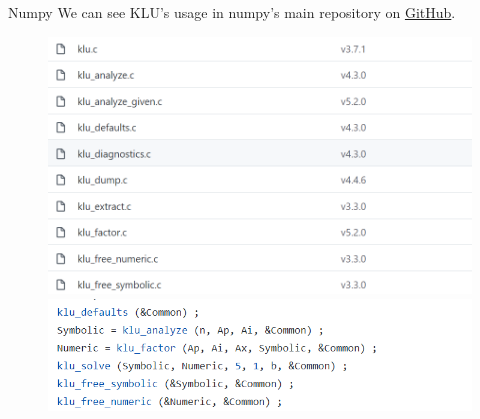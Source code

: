 \documentclass[9pt]{beamer}
\begin{document}
	\begin{frame}{Numpy}
		We can see KLU's usage in numpy's main repository on \href{https://github.com/numpy/numpy}{GitHub}.
		\begin{figure}[H]
			\centering
			\begin{minipage}[ht]{0.4\linewidth} %
				\centering
				\includegraphics[width=1\textwidth]{figures/numpy1.jpg}
			\end{minipage}
			\begin{minipage}[ht]{0.4\linewidth} %
				\centering
				\includegraphics[width=1.2\textwidth]{figures/numpy2.jpg}
			\end{minipage}
		\end{figure}
	\end{frame}
\end{document}
